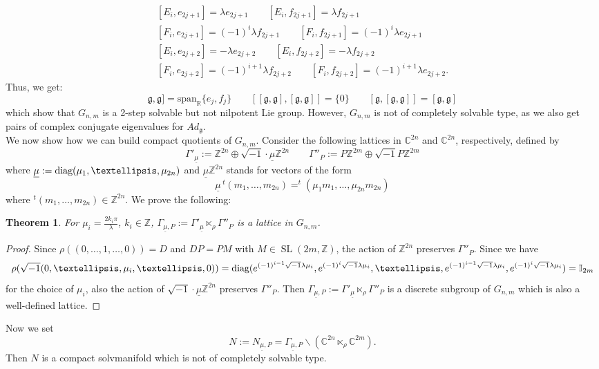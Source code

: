 \documentclass[a4paper, 11pt]{amsart}
\theoremstyle{plain}
\newtheorem{teorema}{Theorem} [section]
\theoremstyle{definition}
\DeclareMathOperator{\SL}{SL}
\numberwithin{equation}{section}
\begin{document}
\begin{gather*}\label{CommutatoriNonCSolvable}
    [E_{i}, e_{2j+1}] = \lambda e_{2j+1} \qquad [E_{i}, f_{2j+1}] = \lambda f_{2j+1} \\
    [F_{i}, e_{2j+1}] = (-1)^{i}\lambda f_{2j+1} \qquad [F_{i}, f_{2j+1}] = (-1)^{i}\lambda e_{2j+1} \\
    [E_{i}, e_{2j+2}] = -\lambda e_{2j+2} \qquad [E_{i}, f_{2j+2}] = -\lambda f_{2j+2} \\
    [F_{i}, e_{2j+2}] = (-1)^{i+1}\lambda f_{2j+2} \qquad [F_{i}, f_{2j+2}] = (-1)^{i+1}\lambda e_{2j+2}. 
\end{gather*}
Thus, we get:
\[\mathfrak{g}, \mathfrak{g}] = \text{span}_{\mathbb{R}}\{e_{j}, f_{j}\} \qquad [[\mathfrak{g}, \mathfrak{g}],[\mathfrak{g}, \mathfrak{g}]] = \{0\} \qquad [\mathfrak{g},[\mathfrak{g}, \mathfrak{g}]] = [\mathfrak{g}, \mathfrak{g}]\]
which show that $G_{n,m}$ is a 2-step solvable but not nilpotent Lie group. However, $G_{n,m}$ is not of completely solvable type, as we also get pairs of complex conjugate eigenvalues for $Ad_{\mathfrak{g}}$.\\[5pt]
We now show how we can build compact quotients of $G_{n,m}$. Consider the following lattices in $\mathbb{C}^{2n}$ and $\mathbb{C}^{2n}$, respectively, defined by
\[ \Gamma'_{\underline{\mu}} := \mathbb{Z}^{2n} \oplus \sqrt{-1}\cdot \underline{\mu}\mathbb{Z}^{2n} \qquad
    \Gamma''_{P} := P\mathbb{Z}^{2m} \oplus \sqrt{-1}P\mathbb{Z}^{2m}\]
where $\underline{\mu} := \hbox{diag}(\mu_{1},\ldots, \mu_{2n})$ and $\underline{\mu}\mathbb{Z}^{2n}$ stands for vectors of the form $$\underline{\mu}\,^t(m_{1}, \ldots, m_{2n})=^t\!\!(\mu_{1}m_{1},\ldots, \mu_{2n}m_{2n})$$ where $^t(m_{1}, \ldots, m_{2n}) \in \mathbb{Z}^{2n}$. We prove the following:
\begin{teorema}\label{LatticeInGenNakamura}
    For $\mu_{i} = \frac{2k_{i}\pi}{\lambda}$, $k_{i} \in \mathbb{Z}$, $\Gamma_{\underline{\mu}, P} :=  \Gamma'_{\underline{\mu}} \ltimes_{\rho} \Gamma''_{P}$ is a lattice in $G_{n,m}$.
\end{teorema}
\begin{proof}
    Since $\rho((0,\ldots, 1, \ldots, 0)) = D$ and $DP = PM$ with $M \in \SL(2m,\mathbb{Z})$, the action of $\mathbb{Z}^{2n}$ preserves $\Gamma''_{P}$. Since we have
    \[\rho(\sqrt{-1}(0,\ldots, \mu_{i}, \ldots, 0)) = \hbox{diag}(e^{(-1)^{i-1}\sqrt{-1}\lambda \mu_{i}}, e^{(-1)^{i}\sqrt{-1}\lambda \mu_{i}}, \ldots, e^{(-1)^{i-1}\sqrt{-1}\lambda \mu_{i}}, e^{(-1)^{i}\sqrt{-1}\lambda \mu_{i}}) = \mathbb{I}_{2m}\]
    for the choice of $\mu_{i}$, also the action of $\sqrt{-1}\cdot \underline{\mu}\mathbb{Z}^{2n}$ preserves $\Gamma''_{P}$. Then $\Gamma_{\underline{\mu}, P} :=  \Gamma'_{\underline{\mu}} \ltimes_{\rho} \Gamma''_{P}$ is a discrete subgroup of $G_{n,m}$ which is also a well-defined lattice.
\end{proof}
 Now we set
 \begin{equation}\label{DefGenNakamura}
     N := N_{\underline{\mu}, P} = \Gamma_{\underline{\mu}, P}  \backslash (\mathbb{C}^{2n} \ltimes_{\rho} \mathbb{C}^{2m}).
 \end{equation}
Then $N$ is a compact solvmanifold which is not of completely solvable type.
\end{document}

